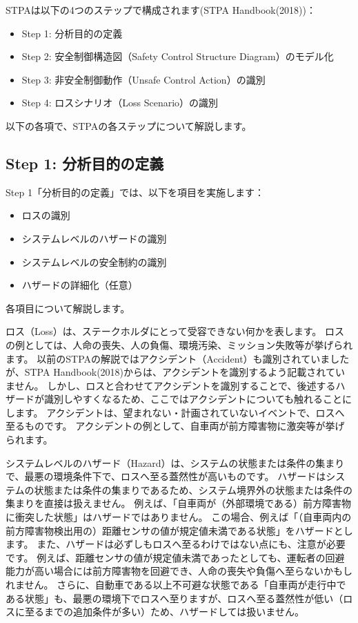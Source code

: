 STPAは以下の4つのステップで構成されます(STPA Handbook(2018))：
%
\begin{itemize}
    \item Step 1: 分析目的の定義
    \item Step 2: 安全制御構造図（Safety Control Structure Diagram）のモデル化
    \item Step 3: 非安全制御動作（Unsafe Control Action）の識別
    \item Step 4: ロスシナリオ（Loss Scenario）の識別
\end{itemize}
%
以下の各項で、STPAの各ステップについて解説します。

\subsection{Step 1: 分析目的の定義}

Step 1「分析目的の定義」では、以下を項目を実施します： %
%
\begin{itemize}
    \item ロスの識別
    \item システムレベルのハザードの識別
    \item システムレベルの安全制約の識別
    \item ハザードの詳細化（任意）
\end{itemize}
%
各項目について解説します。 %

ロス（Loss）は、ステークホルダにとって受容できない何かを表します。
ロスの例としては、人命の喪失、人の負傷、環境汚染、ミッション失敗等が挙げられます。
以前のSTPAの解説ではアクシデント（Accident）も識別されていましたが、STPA Handbook(2018)からは、アクシデントを識別するよう記載されていません。
しかし、ロスと合わせてアクシデントを識別することで、後述するハザードが識別しやすくなるため、ここではアクシデントについても触れることにします。
アクシデントは、望まれない・計画されていないイベントで、ロスへ至るものです。
アクシデントの例として、自車両が前方障害物に激突等が挙げられます。

システムレベルのハザード（Hazard）は、システムの状態または条件の集まりで、最悪の環境条件下で、ロスへ至る蓋然性が高いものです。
ハザードはシステムの状態または条件の集まりであるため、システム境界外の状態または条件の集まりを直接は扱えません。
例えば、「自車両が（外部環境である）前方障害物に衝突した状態」はハザードではありません。
この場合、例えば「（自車両内の前方障害物検出用の）距離センサの値が規定値未満である状態」をハザードとします。
また、ハザードは必ずしもロスへ至るわけではない点にも、注意が必要です。
例えば、距離センサの値が規定値未満であったとしても、運転者の回避能力が高い場合には前方障害物を回避でき、人命の喪失や負傷へ至らないかもしれません。
さらに、自動車である以上不可避な状態である「自車両が走行中である状態」も、最悪の環境下でロスへ至りますが、ロスへ至る蓋然性が低い（ロスに至るまでの追加条件が多い）ため、ハザードしては扱いません。

